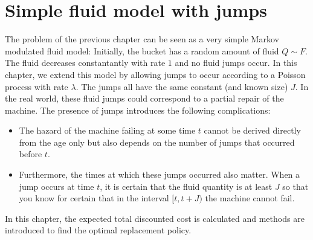 \chapter{Simple fluid model with jumps}\label{chapter:SimpleFluid}
The problem of the previous chapter can be seen as a very simple Markov modulated fluid model:
Initially, the bucket has a random amount of fluid $Q\sim F$.
The fluid decreases constantantly with rate $1$ and no fluid jumps occur.
In this chapter, we extend this model by allowing jumps to occur according to a Poisson process with rate $\lambda$.
The jumps all have the same constant (and known size) $J$.
In the real world, these fluid jumps could correspond to a partial repair of the machine.
The presence of jumps introduces the following complications:
\begin{itemize}
	\item The hazard of the machine failing at some time $t$ cannot be derived directly from the age only but also depends on the number of jumps that occurred before $t$.
	\item Furthermore, the times at which these jumps occurred also matter.
	When a jump occurs at time $t$, it is certain that the fluid quantity is at least $J$ so that you know for certain that in the interval $[t,t+J)$ the machine cannot fail.
\end{itemize}
In this chapter, the expected total discounted cost is calculated and methods are introduced to find the optimal replacement policy.







